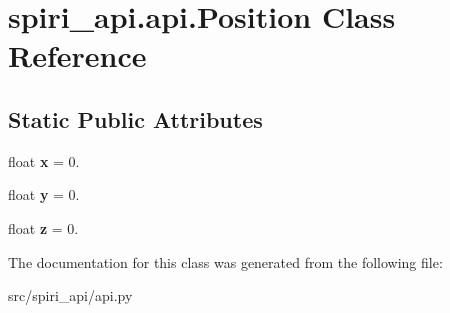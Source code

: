 \hypertarget{classspiri__api_1_1api_1_1_position}{\section{spiri\-\_\-api.\-api.\-Position \-Class \-Reference}
\label{classspiri__api_1_1api_1_1_position}
}
\subsection*{\-Static \-Public \-Attributes}
\begin{DoxyCompactItemize}
\item 
\hypertarget{classspiri__api_1_1api_1_1_position_ab13371d1dbc29170c4f2c1dc9d75de40}{float {\bfseries x} = 0.}\label{classspiri__api_1_1api_1_1_position_ab13371d1dbc29170c4f2c1dc9d75de40}

\item 
\hypertarget{classspiri__api_1_1api_1_1_position_a4a4e3961075f8b379f3c760380dd8656}{float {\bfseries y} = 0.}\label{classspiri__api_1_1api_1_1_position_a4a4e3961075f8b379f3c760380dd8656}

\item 
\hypertarget{classspiri__api_1_1api_1_1_position_a145a5715ebe0ebc0a9ed66e26a538807}{float {\bfseries z} = 0.}\label{classspiri__api_1_1api_1_1_position_a145a5715ebe0ebc0a9ed66e26a538807}

\end{DoxyCompactItemize}


\-The documentation for this class was generated from the following file\-:\begin{DoxyCompactItemize}
\item 
src/spiri\-\_\-api/api.\-py\end{DoxyCompactItemize}
